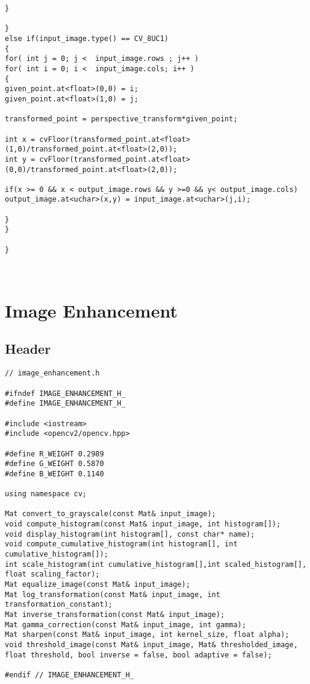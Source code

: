 \begin{lstlisting}
}

}
else if(input_image.type() == CV_8UC1)
{
for( int j = 0; j <  input_image.rows ; j++ )
for( int i = 0; i <  input_image.cols; i++ )
{
given_point.at<float>(0,0) = i;
given_point.at<float>(1,0) = j;

transformed_point = perspective_transform*given_point;

int x = cvFloor(transformed_point.at<float>(1,0)/transformed_point.at<float>(2,0));
int y = cvFloor(transformed_point.at<float>(0,0)/transformed_point.at<float>(2,0));

if(x >= 0 && x < output_image.rows && y >=0 && y< output_image.cols)
output_image.at<uchar>(x,y) = input_image.at<uchar>(j,i);

}
}

}



\end{lstlisting}

\pagebreak
\section{Image Enhancement}

\subsection{Header}
\begin{lstlisting}
// image_enhancement.h

#ifndef IMAGE_ENHANCEMENT_H_
#define IMAGE_ENHANCEMENT_H_

#include <iostream>
#include <opencv2/opencv.hpp>

#define R_WEIGHT 0.2989
#define G_WEIGHT 0.5870
#define B_WEIGHT 0.1140

using namespace cv;

Mat convert_to_grayscale(const Mat& input_image);
void compute_histogram(const Mat& input_image, int histogram[]);
void display_histogram(int histogram[], const char* name);
void compute_cumulative_histogram(int histogram[], int cumulative_histogram[]);
int scale_histogram(int cumulative_histogram[],int scaled_histogram[], float scaling_factor);
Mat equalize_image(const Mat& input_image);
Mat log_transformation(const Mat& input_image, int transformation_constant);
Mat inverse_transformation(const Mat& input_image);
Mat gamma_correction(const Mat& input_image, int gamma);
Mat sharpen(const Mat& input_image, int kernel_size, float alpha);
void threshold_image(const Mat& input_image, Mat& thresholded_image, float threshold, bool inverse = false, bool adaptive = false);

#endif // IMAGE_ENHANCEMENT_H_

\end{lstlisting}

